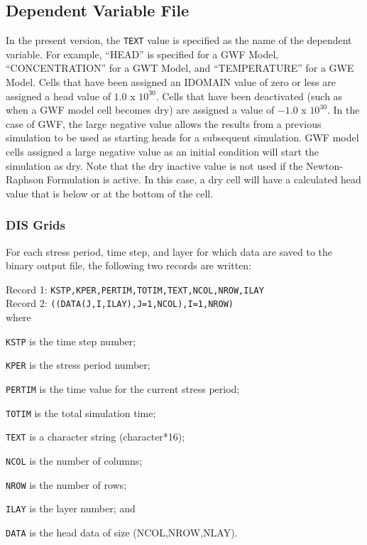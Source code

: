 \newpage
\subsection{Dependent Variable File}
In the present \mf version, the \texttt{TEXT} value is specified as the name of the dependent variable.  For example, ``HEAD'' is specified for a GWF Model, ``CONCENTRATION'' for a GWT Model, and ``TEMPERATURE'' for a GWE Model.  Cells that have been assigned an IDOMAIN value of zero or less are assigned a head value of $1.0$ x $10^{30}$.  Cells that have been deactivated (such as when a GWF model cell becomes dry) are assigned a value of $-1.0$ x $10^{30}$.  In the case of GWF, the large negative value allows the results from a previous simulation to be used as starting heads for a subsequent simulation.  GWF model cells assigned a large negative value as an initial condition will start the simulation as dry.  Note that the dry inactive value is not used if the Newton-Raphson Formulation is active.  In this case, a dry cell will have a calculated head value that is below or at the bottom of the cell.

\subsubsection{DIS Grids}
For each stress period, time step, and layer for which data are saved to the binary output file, the following two records are written:

\vspace{5mm}
\noindent Record 1: \texttt{KSTP,KPER,PERTIM,TOTIM,TEXT,NCOL,NROW,ILAY} \\
\noindent Record 2: \texttt{((DATA(J,I,ILAY),J=1,NCOL),I=1,NROW)} \\

\vspace{5mm}
\noindent where

\begin{description} \itemsep0pt \parskip0pt 
\item \texttt{KSTP} is the time step number;
\item \texttt{KPER} is the stress period number;
\item \texttt{PERTIM} is the time value for the current stress period; 
\item \texttt{TOTIM} is the total simulation time;
\item \texttt{TEXT} is a character string (character*16);
\item \texttt{NCOL} is the number of columns;
\item \texttt{NROW} is the number of rows;
\item \texttt{ILAY} is the layer number; and
\item \texttt{DATA} is the head data of size (NCOL,NROW,NLAY).
\end{description}

